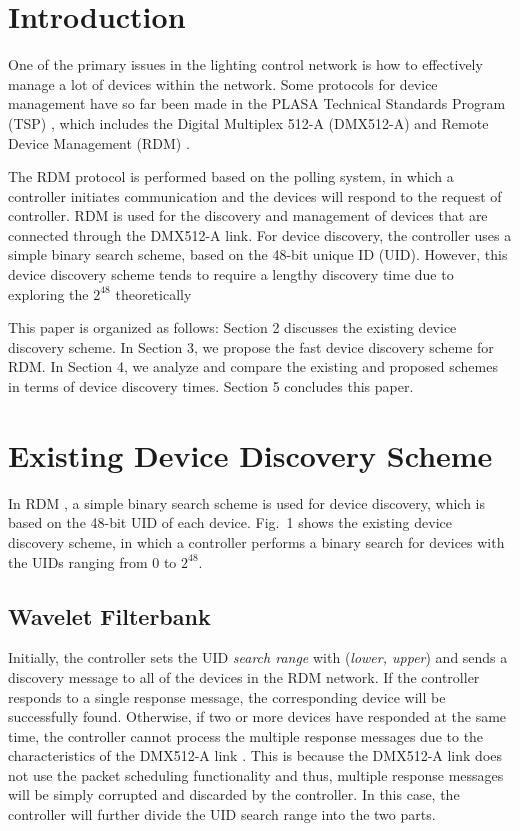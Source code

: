 \documentclass[10pt,twoside]{article}
\begin{document}

\section{Introduction}

One of the primary issues in the lighting control network is how to
effectively manage a lot of devices within the network. Some protocols for
device management have so far been made in the PLASA Technical Standards
Program (TSP) \cite{ref1}, which includes the Digital Multiplex 512-A
(DMX512-A) \cite{ref2} and Remote Device Management (RDM) \cite{ref3}.

The RDM protocol is performed based on the polling system, in which a
controller initiates communication and the devices will respond to the request
of controller. RDM is used for the discovery and management of devices that
are connected through the DMX512-A link. For device discovery, the controller
uses a simple binary search scheme, based on the 48-bit unique ID (UID).
However, this device discovery scheme tends to require a lengthy discovery
time due to exploring the $2^{48}$ theoretically

This paper is organized as follows: Section 2 discusses the existing device
discovery scheme. In Section 3, we propose the fast device discovery scheme
for RDM. In Section 4, we analyze and compare the existing and proposed
schemes in terms of device discovery times. Section 5 concludes this paper.

\section{Existing Device Discovery Scheme}

In RDM \cite{ref3}, a simple binary search scheme is used for device
discovery, which is based on the 48-bit UID of each device. Fig.~1 shows the
existing device discovery scheme, in which a controller performs a binary
search for devices with the UIDs ranging from 0 to $2^{48}$.

\subsection{Wavelet Filterbank}

Initially, the controller sets the UID \textit{search range} with
(\textit{lower, upper}) and sends a discovery message to all of the devices in
the RDM network. If the controller responds to a single response message, the
corresponding device will be successfully found. Otherwise, if two or more
devices have responded at the same time, the controller cannot process the
multiple response messages due to the characteristics of the DMX512-A link
\cite{ref2}. This is because the DMX512-A link does not use the packet
scheduling functionality and thus, multiple response messages will be simply
corrupted and discarded by the controller. In this case, the controller will
further divide the UID search range into the two parts.
\end{document}
